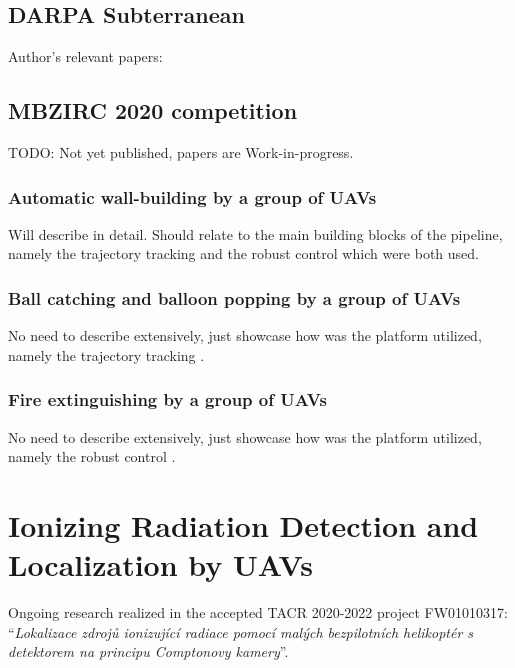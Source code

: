 \documentclass[a4paper,11pt,titlepage,twoside]{book}
\newcommand{\chapternoclear}[1]{
  \begingroup
  \let\cleardoublepage\clearpage
  \chapter{#1}
  \endgroup
}
\begin{document}
\section{DARPA Subterranean}

Author's relevant papers: \cite{petrlik2020robust, roucek2019darpa}

\section{MBZIRC 2020 competition}

TODO: Not yet published, papers are Work-in-progress.

\subsection{Automatic wall-building by a group of UAVs}

Will describe in detail. Should relate to the main building blocks of the pipeline, namely the trajectory tracking \cite{baca2018model} and the robust control \cite{petrlik2020robust} which were both used.

\subsection{Ball catching and balloon popping by a group of UAVs}

No need to describe extensively, just showcase how was the platform utilized, namely the trajectory tracking \cite{baca2018model}.

\subsection{Fire extinguishing by a group of UAVs}

No need to describe extensively, just showcase how was the platform utilized, namely the robust control \cite{petrlik2020robust}.



\chapternoclear{Ionizing Radiation Detection and Localization by UAVs}

Ongoing research realized in the accepted TACR 2020-2022 project FW01010317:\\
``\textit{Lokalizace zdrojů ionizující radiace pomocí malých bezpilotních helikoptér s detektorem na principu Comptonovy kamery}''.
\end{document}
